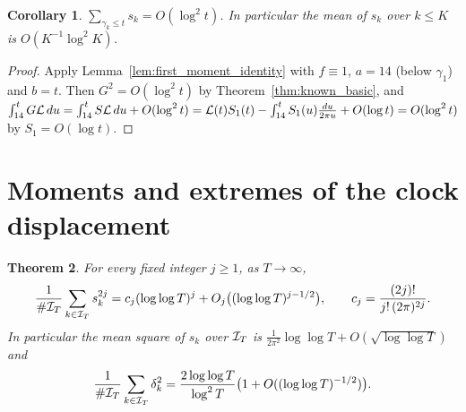 \documentclass[11pt,reqno]{amsart}
\theoremstyle{plain}\newtheorem{theorem}{Theorem}[section]\newtheorem{proposition}[theorem]{Proposition}\newtheorem{lemma}[theorem]{Lemma}\newtheorem{corollary}[theorem]{Corollary}
\theoremstyle{definition}\newtheorem{hypothesis}[theorem]{Hypothesis}\newtheorem{definition}[theorem]{Definition}
\theoremstyle{remark}\newtheorem{remark}[theorem]{Remark}\newtheorem{experiment}[theorem]{Experiment}\newtheorem{question}[theorem]{Question}\newtheorem{heuristic}[theorem]{Heuristic}\newtheorem{conjecture}[theorem]{Conjecture}
\begin{document}
\begin{corollary}\label{cor:cumulative}
$\sum_{\gamma_k\le t}s_k=O(\log^2t)$. In particular the mean of $s_k$ over $k\le K$ is $O(K^{-1}\log^2K)$.
\end{corollary}

\begin{proof}
Apply Lemma~\ref{lem:first_moment_identity} with $f\equiv1$, $a=14$ (below $\gamma_1$) and $b=t$. Then $G^2=O(\log^2t)$ by Theorem~\ref{thm:known_basic}, and $\int_{14}^tG\mathcal L\,du=\int_{14}^tS\mathcal L\,du+O(\log^2t)=\mathcal L(t)S_1(t)-\int_{14}^tS_1(u)\frac{du}{2\pi u}+O(\log t)=O(\log^2t)$ by $S_1=O(\log t)$.
\end{proof}

\section{Moments and extremes of the clock displacement}
\label{sec:clock_moments}

\begin{theorem}\label{thm:clock_moments}
For every fixed integer $j\ge1$, as $T\to\infty$,
\begin{equation}
\frac1{\#\mathcal I_T}\sum_{k\in\mathcal I_T}s_k^{2j}=c_j(\log\log T)^j+O_j\bigl((\log\log T)^{j-1/2}\bigr),\qquad c_j=\frac{(2j)!}{j!\,(2\pi)^{2j}} .
\label{eq:clock_moments}
\end{equation}
In particular the mean square of $s_k$ over $\mathcal I_T$ is $\frac1{2\pi^2}\log\log T+O(\sqrt{\log\log T})$ and
\begin{equation}
\frac1{\#\mathcal I_T}\sum_{k\in\mathcal I_T}\delta_k^2=\frac{2\log\log T}{\log^2T}\bigl(1+O((\log\log T)^{-1/2})\bigr).
\label{eq:delta_mean_square}
\end{equation}
\end{theorem}
\end{document}
